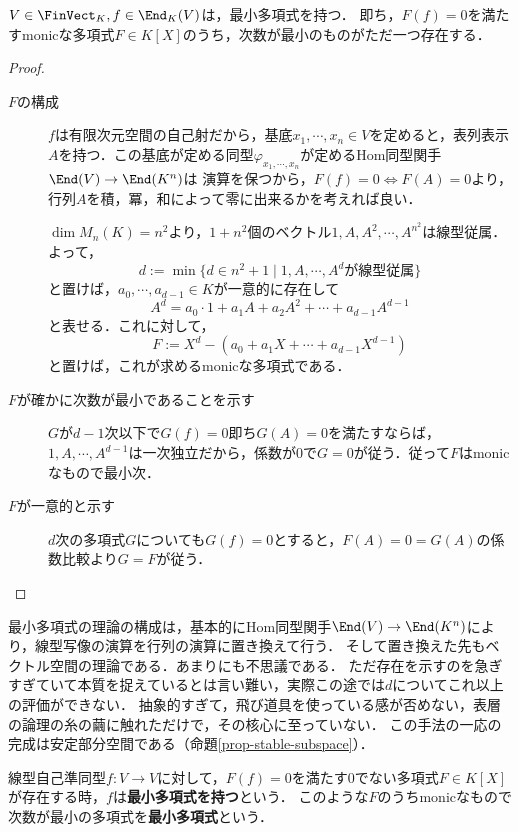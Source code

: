 \documentclass[uplatex, dvipdfmx]{jsreport}
\begin{document}
\begin{proposition}[有限次元線型空間の自己射は必ず最小多項式を持つ]\label{prop-existence-of-minimal-polynomial}
    $V\in\FinVect_K,f\in\End_K(V)$は，最小多項式を持つ．
    即ち，$F(f)=0$を満たすmonicな多項式$F\in K[X]$のうち，次数が最小のものがただ一つ存在する．
\end{proposition}
\begin{proof}
    \begin{description}
        \item[$F$の構成] $f$は有限次元空間の自己射だから，基底$x_1,\cdots,x_n\in V$を定めると，表列表示$A$を持つ．この基底が定める同型$\varphi_{x_1,\cdots,x_n}$が定めるHom同型関手$\End(V)\to\End(K^n)$は
        演算を保つから，$F(f)=0\Leftrightarrow F(A)=0$より，行列$A$を積，冪，和によって零に出来るかを考えれば良い．

        $\dim M_n(K)=n^2$より，$1+n^2$個のベクトル$1,A,A^2,\cdots,A^{n^2}$は線型従属．
        よって，
        \[ d:=\min\{d\in n^2+1\mid 1,A,\cdots,A^dが線型従属\} \]
        と置けば，$a_0,\cdots,a_{d-1}\in K$が一意的に存在して
        \[ A^d=a_0\cdot 1+a_1A+a_2A^2+\cdots+a_{d-1}A^{d-1} \]
        と表せる．これに対して，
        \[ F:=X^d-(a_0+a_1X+\cdots+a_{d-1}X^{d-1}) \]
        と置けば，これが求めるmonicな多項式である．
        \item[$F$が確かに次数が最小であることを示す] $G$が$d-1$次以下で$G(f)=0$即ち$G(A)=0$を満たすならば，$1,A,\cdots,A^{d-1}$は一次独立だから，係数が$0$で$G=0$が従う．従って$F$はmonicなもので最小次．
        \item[$F$が一意的と示す] $d$次の多項式$G$についても$G(f)=0$とすると，$F(A)=0=G(A)$の係数比較より$G=F$が従う．
    \end{description}
\end{proof}
\begin{remark}
    最小多項式の理論の構成は，基本的にHom同型関手$\End(V)\to\End(K^n)$により，線型写像の演算を行列の演算に置き換えて行う．
    そして置き換えた先もベクトル空間の理論である．あまりにも不思議である．
    ただ存在を示すのを急ぎすぎていて本質を捉えているとは言い難い，実際この途では$d$についてこれ以上の評価ができない．
    抽象的すぎて，飛び道具を使っている感が否めない，表層の論理の糸の繭に触れただけで，その核心に至っていない．
    この手法の一応の完成は安定部分空間である（命題\ref{prop-stable-subspace}）．
\end{remark}

\begin{definition}
    線型自己準同型$f:V\to V$に対して，$F(f)=0$を満たす$0$でない多項式$F\in K[X]$が存在する時，$f$は\textbf{最小多項式を持つ}という．
    このような$F$のうちmonicなもので次数が最小の多項式を\textbf{最小多項式}という．
\end{definition}
\end{document}
